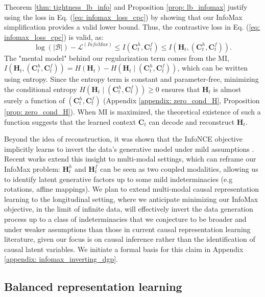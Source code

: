 \documentclass{article}
\theoremstyle{plain}
\theoremstyle{definition}
\theoremstyle{remark}
\begin{document}
Theorem \ref{thm: tightness_lb_info} and Proposition \ref{prop: lb_infomax} justify using the loss in Eq. (\ref{eq: infomax_loss_cpc}) by showing that our InfoMax simplification provides a valid lower bound. Thus, the contrastive loss in Eq. (\ref{eq: infomax_loss_cpc}) is valid, as:
\begin{equation}
\log(|\mathcal{B}|) - \mathcal{L}^{(InfoMax)} \leq I(\mathbf{C}_t^h, \mathbf{C}_t^f) \leq I(\mathbf{H}_t, (\mathbf{C}_t^h, \mathbf{C}_t^f)).
\end{equation}
The "mental model" behind our regularization term comes from the MI, \( I(\mathbf{H}_t, (\mathbf{C}_t^h, \mathbf{C}_t^f)) = H(\mathbf{H}_t) - H(\mathbf{H}_t \mid (\mathbf{C}_t^h, \mathbf{C}_t^f)) \), which can be written using entropy.
Since the entropy term is constant and parameter-free, minimizing the conditional entropy \( H(\mathbf{H}_t \mid (\mathbf{C}_t^h, \mathbf{C}_t^f)) \geq 0 \) ensures that \( \mathbf{H}_t \) is almost surely a function of \( (\mathbf{C}_t^h, \mathbf{C}_t^f) \) (Appendix \ref{appendix: zero_cond_H}, Proposition \ref{prop: zero_cond_H}). When MI is maximized, the theoretical existence of such a function suggests that the learned context \( \mathbf{C}_t \) can decode and reconstruct \( \mathbf{H}_t \).
  
Beyond the idea of reconstruction, it was shown that the InfoNCE objective implicitly learns to invert the data's generative model under mild assumptions \citep{zimmermann2021contrastive}. Recent works \citep{daunhawer2023identifiability, liu2024revealing} extend this insight to multi-modal settings, which can reframe our InfoMax problem: $\mathbf{H}_t^h$ and $\mathbf{H}_t^f$ can be seen as two coupled modalities, allowing us to identify latent generative factors up to some mild indeterminacies (e.g rotations, affine mappings). We plan to extend multi-modal causal representation learning to the longitudinal setting, where we anticipate minimizing our InfoMax objective, in the limit of infinite data, will effectively invert the data generation process up to a class of indeterminacies that we conjecture to be broader and under weaker assumptions than those in current causal representation learning literature, given our focus is on causal inference rather than the identification of causal latent variables. We initiate a formal basis for this claim in Appendix \ref{appendix: infomax_inverting_dgp}.

\subsection{Balanced representation learning}
\end{document}
